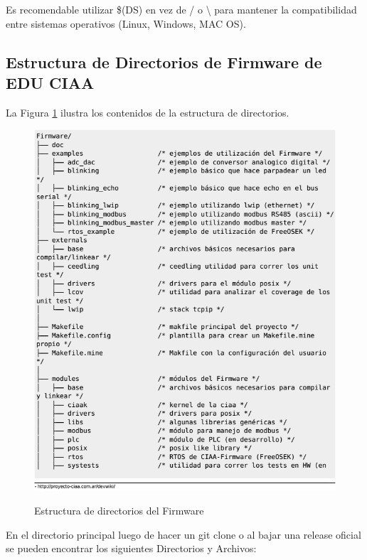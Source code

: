 \documentclass[12pt,letterpaper]{article}
\begin{document}
Es recomendable utilizar \$(DS) en vez de / o \textbackslash{} para mantener la compatibilidad entre sistemas operativos (Linux, Windows, MAC OS).
{
\subsection{Estructura de Directorios de Firmware de EDU CIAA}
La Figura \ref{Fig3} ilustra los contenidos de la estructura de directorios.
\begin{figure}[H]
\centering
\includegraphics[width=8 cm]{figuras/est_directorios_ciaa.png}\\
\caption{Estructura de directorios del Firmware}
\label{Fig3}
\end{figure}

En el directorio principal luego de hacer un git clone o al bajar una release oficial se pueden encontrar los siguientes Directorios y Archivos\cite{estructuradedirectorios}:

}
\end{document}

